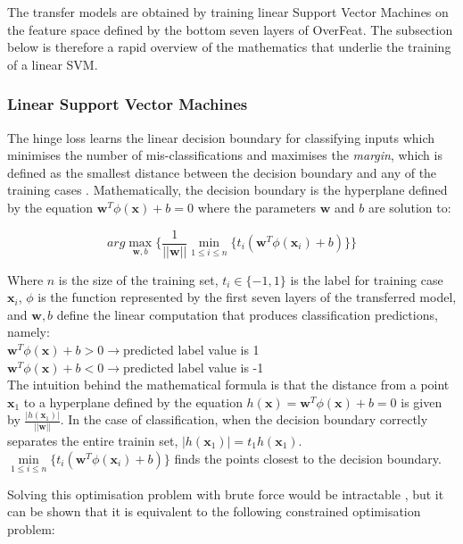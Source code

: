 \documentclass[a4paper,11pt]{article}
\begin{document}
The transfer models are obtained by training linear Support Vector Machines on the feature space defined by the bottom seven layers of OverFeat. The subsection below is therefore a rapid overview of the mathematics that underlie the training of a linear SVM. 

\subsubsection{Linear Support Vector Machines}

The hinge loss learns the linear decision boundary for classifying inputs which minimises the number of mis-classifications and maximises the \textit{margin}, which is defined as the smallest distance between the decision boundary and any of the training cases \cite{ML-book}. Mathematically, the decision boundary is the hyperplane defined by the equation $\textbf{w}^T \phi(\textbf{x}) + b = 0$ where the parameters $\textbf{w}$ and $b$ are solution to:

\begin{equation}
arg\max\limits_{\textbf{w},b}\{\frac{1}{||\textbf{w}||} \min\limits_{1 \leq i \leq n}\{t_i (\textbf{w}^T \phi(\textbf{x}_i)+b)\}\}
\end{equation}

Where $n$ is the size of the training set, $t_i \in \{-1,1\}$ is the label for training case $\textbf{x}_i$, $\phi$ is the function represented by the first seven layers of the transferred model, and $\textbf{w},b$ define the linear computation that produces classification predictions, namely: \\

$\textbf{w}^T \phi(\textbf{x}) + b > 0 \rightarrow $predicted label value is 1 \\
$\textbf{w}^T \phi(\textbf{x}) + b < 0 \rightarrow $predicted label value is -1 \\

The intuition behind the mathematical formula is that the distance from a point $\textbf{x}_1$ to a hyperplane defined by the equation $h(\textbf{x}) = \textbf{w}^T \phi(\textbf{x}) + b = 0$ is given by $\frac{|h(\textbf{x}_1)|}{||\textbf{w}||}$. In the case of classification, when the decision boundary correctly separates the entire trainin set, $|h(\textbf{x}_1)| = t_1 h(\textbf{x}_1)$. $\min\limits_{1 \leq i \leq n}\{t_i (\textbf{w}^T \phi(\textbf{x}_i)+b)\}$ finds the points closest to the decision boundary. 

Solving this optimisation problem with brute force would be intractable \cite{ML-book}, but it can be shown that it is equivalent to the following constrained optimisation problem:
\end{document}
